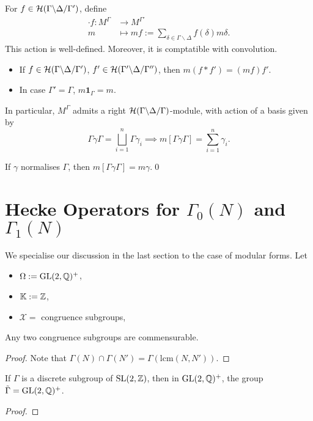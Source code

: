 \begin{defthm}
    For $f\in\mathcal{H}({\Gamma}\backslash {\Delta}\slash {\Gamma'})$, define \begin{align*}
        \cdot f : M^\Gamma &\longrightarrow M^{\Gamma'}\\
            m &\longmapsto mf :=
            \sum_{\delta\in\Gamma\backslash\Delta}
                f(\delta) m\delta.
    \end{align*}
    This action is well-defined.
    Moreover, it is comptatible with convolution.\begin{itemize}
        \item If $f\in\mathcal{H}({\Gamma}\backslash {\Delta}\slash {\Gamma'})$, $f'\in\mathcal{H}({\Gamma'}\backslash {\Delta}\slash {\Gamma''})$, then $m(f*f') = (mf)f'$.
        \item In case $\Gamma' = \Gamma$, $m \boldsymbol{1}_\Gamma = m$.
    \end{itemize}
    In particular, $M^\Gamma$ admits a right $\mathcal{H}({\Gamma}\backslash {\Delta}\slash {\Gamma})$-module,
    with action of a basis given by \[\Gamma\gamma\Gamma = \bigsqcup_{i=1}^n \Gamma \gamma_i
    \implies m[\Gamma\gamma\Gamma] = \sum_{i=1}^n\gamma_i.\]
\end{defthm}
\begin{corollary}
    If $\gamma$ normalises $\Gamma$, then $m[\Gamma
    \gamma\Gamma] = m\gamma$.\qed
\end{corollary}

\section{\texorpdfstring{{Hecke Operators for $\Gamma_0(N)$ and $\Gamma_1(N)$}}{Hecke Operators for Gamma0(N) and Gamma1(N)}}

We specialise our discussion in the last section to the case of modular forms. Let \begin{itemize}
    \item $\Omega := \operatorname{GL}(2, \mathbb{Q})^+$,
    \item $\mathbb{K} := \mathbb{Z}$,
    \item $\mathscr{X} = $ congruence subgroups,
\end{itemize}

\begin{lemma}
    Any two congruence subgroups are commensurable.
\end{lemma}
\begin{proof}
    Note that $\Gamma(N)\cap \Gamma(N') = \Gamma(\mathrm{lcm}(N, N'))$.
\end{proof}
\begin{lemma}
    If $\Gamma$ is a discrete subgroup of $\operatorname{SL}(2,\mathbb{Z})$, then in $\operatorname{GL}(2, \mathbb{Q})^+$, the group $\tilde{\Gamma} = \operatorname{GL}(2, \mathbb{Q})^+$.
\end{lemma}
\begin{proof}
    
\end{proof}


